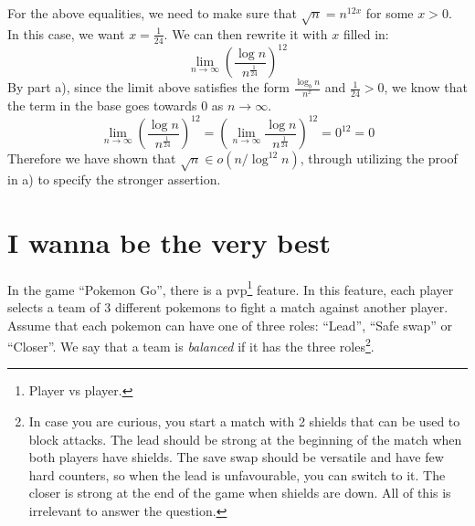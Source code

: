 \documentclass[letterpaper,11pt]{article}
\theoremstyle{plain}
\theoremstyle{definition}
\begin{document}
{\begin{enumerate}[a)]
    For the above equalities, we need to make sure that $\sqrt{n} = n^{12x}$ for some $x > 0$. In this case, we want $x = \frac{1}{24}$. We can then rewrite it with $x$ filled in:
    \[\lim_{n \to \infty} \left(\frac{\log n}{n^{\frac{1}{24}}}\right)^{12}\]
    By part a), since the limit above satisfies the form $\frac{\log_b n}{n^x}$ and $\frac{1}{24} > 0$, we know that the term in the base goes towards 0 as $n \to \infty$.
    \[\lim_{n \to \infty} \left(\frac{\log n}{n^{\frac{1}{24}}}\right)^{12} = (\lim_{n \to \infty} \frac{\log n}{n^{\frac{1}{24}}})^{12} = 0^{12} = 0\]
    Therefore we have shown that $\sqrt{n} \in o(n/\log^{12} n)$, through utilizing the proof in a) to specify the stronger assertion.
    \end{enumerate}
}
\newpage		
\section{I wanna be the very best}
In the game ``Pokemon Go'', there is a pvp\footnote{Player vs player.} feature. In this feature, each player selects a team of 3 different pokemons to fight a match against another player. Assume that each pokemon can have one of three roles: ``Lead'', ``Safe swap'' or ``Closer''. We say that a team is \emph{balanced} if it has the three roles\footnote{In case you are curious, you start a match with 2 shields that can be used to block attacks. The lead should be strong at the beginning of the match when both players have shields. The save swap should be versatile and have few hard counters, so when the lead is unfavourable, you can switch to it. The closer is strong at the end of the game when shields are down. All of this is irrelevant to answer the question.}.   
\end{document}
